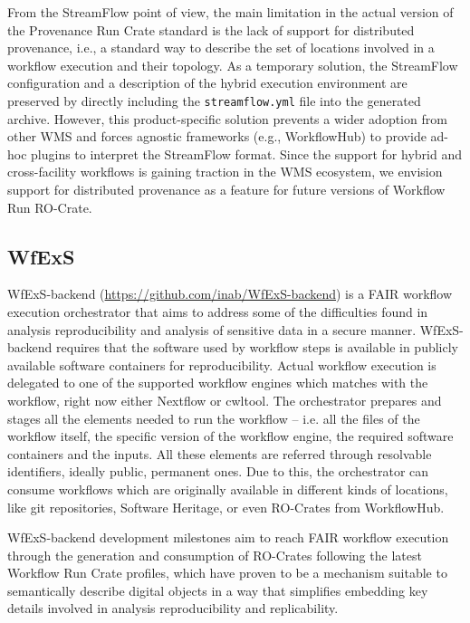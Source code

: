 \documentclass[10pt,letterpaper]{article}
\begin{document}
From the StreamFlow point of view, the main limitation in the actual version of the Provenance Run Crate standard is the lack of support for distributed provenance, i.e., a standard way to describe the set of locations involved in a workflow execution and their topology. As a temporary solution,
the StreamFlow configuration and a description of the hybrid execution environment are preserved by directly including the \texttt{streamflow.yml} file into the generated archive.
However, this product-specific solution prevents a wider adoption from other WMS and forces agnostic frameworks (e.g., WorkflowHub) to provide ad-hoc plugins to interpret the StreamFlow format.
Since the support for hybrid and cross-facility workflows is gaining traction in the WMS ecosystem, we envision support for distributed provenance as a feature for future versions of Workflow Run RO-Crate.

\subsection{WfExS}\label{wfexs}

WfExS-backend (\url{https://github.com/inab/WfExS-backend}) is a FAIR workflow execution orchestrator that aims to address some of the difficulties found in analysis reproducibility and analysis of sensitive data in a secure manner.
WfExS-backend requires that the software used by workflow steps is available in publicly available software containers for reproducibility.
Actual workflow execution is delegated to one of the supported workflow engines which matches with the workflow, right now either Nextflow or cwltool.
The orchestrator prepares and stages all the elements needed to run the workflow – i.e. all the files of the workflow itself, the specific version of the workflow engine, the required software containers and the inputs.
All these elements are referred through resolvable identifiers, ideally public, permanent ones.
Due to this, the orchestrator can consume workflows which are originally available in different kinds of locations, like git repositories, Software Heritage, or even RO-Crates from WorkflowHub.

WfExS-backend development milestones aim to reach FAIR workflow execution through the generation and consumption of RO-Crates following the latest Workflow Run Crate profiles, which have proven to be a mechanism suitable to semantically describe digital objects in a way that simplifies embedding key details involved in analysis reproducibility and replicability.
\end{document}
